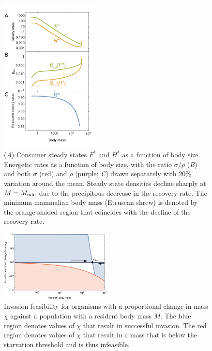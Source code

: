 \documentclass{pnastwo}
\begin{document}
\begin{figure}
\centering
\includegraphics[width=0.45\textwidth]{fig_FPAllometric.pdf}
\caption{ (\emph{A}) Consumer steady states $F^*$ and $H^*$ as a function of
  body size.  Energetic rates as a function of body size, with the ratio
  $\sigma/\rho$ (\emph{B}) and both $\sigma$ (red) and $\rho$ (purple;
  \emph{C}) drawn separately with 20\% variation around the mean.  Steady
  state densities decline sharply at $M=M_{\rm min}$ due to the precipitous
  decrease in the recovery rate.  The minimum mammalian body mass (Etruscan
  shrew) is denoted by the orange shaded region that coincides with the
  decline of the recovery rate.  }
\label{fig:mass}
\end{figure}  
 
\begin{figure}
\centering
\includegraphics[width=0.5\textwidth]{fig_Invasion.pdf}
\caption{ Invasion feasibility for organisms with a proportional change in
  mass $\chi$ against a population with a resident body mass $M$.  The blue
  region denotes values of $\chi$ that result in successful invasion.  The
  red region denotes values of $\chi$ that result in a mass that is below the
  starvation threshold and is thus infeasible.  }
\label{fig:invasion}
\end{figure}  
 
\end{document}
